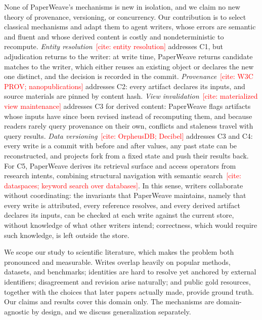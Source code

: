 \documentclass[sigconf,review,anonymous]{acmart}
\newcommand{\citeneeded}[1]{\textcolor{red}{[cite: #1]}}
\begin{document}
None of PaperWeave's mechanisms is new in isolation, and we claim no new theory
of provenance, versioning, or concurrency. Our contribution is to select
classical mechanisms and adapt them to agent writers, whose errors are semantic
and fluent and whose derived content is costly and nondeterministic to
recompute. \emph{Entity resolution}~\citeneeded{entity resolution} addresses C1,
but adjudication returns to the writer: at write time, PaperWeave returns
candidate matches to the writer, which either reuses an existing object or
declares the new one distinct, and the decision is recorded in the commit.
\emph{Provenance}~\citeneeded{W3C PROV; nanopublications} addresses C2: every
artifact declares its inputs, and source materials are pinned by content hash.
\emph{View invalidation}~\citeneeded{materialized view maintenance} addresses C3
for derived content: PaperWeave flags artifacts whose inputs have since been
revised instead of recomputing them, and because readers rarely query
provenance on their own, conflicts and staleness travel with query results.
\emph{Data versioning}~\cite{2026-Git4Data}\citeneeded{OrpheusDB; Decibel}
addresses C3 and C4: every write is a commit with before and after values, any
past state can be reconstructed, and projects fork from a fixed state and push
their results back.
For C5, PaperWeave derives its retrieval surface and access operators from
research intents, combining structural navigation with semantic
search~\citeneeded{dataspaces; keyword search over databases}.
In this sense, writers collaborate without coordinating: the invariants that
PaperWeave maintains, namely that every write is attributed, every reference
resolves, and every derived artifact declares its inputs, can be checked at
each write against the current store, without knowledge of what other writers
intend; correctness, which would require such knowledge, is left outside the
store.

We scope our study to scientific literature, which makes the problem both
pronounced and measurable. Writes overlap heavily on popular methods, datasets,
and benchmarks; identities are hard to resolve yet anchored by external
identifiers; disagreement and revision arise naturally; and public gold
resources, together with the choices that later papers actually made, provide
ground truth. Our claims and results cover this domain only. The mechanisms are
domain-agnostic by design, and we discuss generalization separately.
\end{document}
